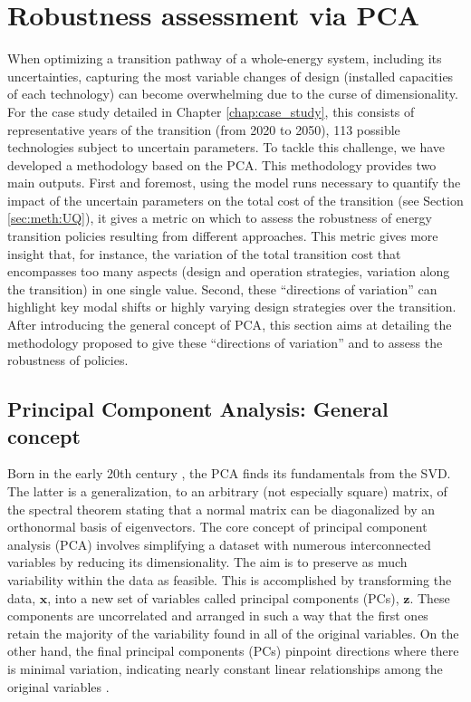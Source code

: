 \section{Robustness assessment via PCA}
\label{sec:meth:PCA}
When optimizing a transition pathway of a whole-energy system, including its uncertainties, capturing the most variable changes of design (\ie installed capacities of each technology) can become overwhelming due to the curse of dimensionality. For the case study detailed in Chapter \ref{chap:case_study}, this consists of  representative years of the transition (\ie from 2020 to 2050), 113 possible technologies subject to uncertain parameters. To tackle this challenge, we have developed a methodology based on the \acrfull{PCA}. This methodology provides two main outputs. First and foremost, using the model runs necessary to quantify the impact of the uncertain parameters on the total cost of the transition (see Section \ref{sec:meth:UQ}), it gives a metric on which to assess the robustness of energy transition policies resulting from different approaches. This metric gives more insight that, for instance, the variation of the total transition cost that encompasses too many aspects (\ie design and operation strategies, variation along the transition) in one single value. Second, these ``directions of variation'' can highlight key modal shifts or highly varying design strategies over the transition. After introducing the general concept of \gls{PCA}, this section aims at detailing the methodology proposed to give these ``directions of variation'' and to assess the robustness of policies.

\subsection{Principal Component Analysis: General concept}
\label{subsec:meth:PCA:PCA}
Born in the early 20th century \cite{pearson1901on,hotelling1933analysis}, the \acrfull{PCA} finds its fundamentals from the \gls{SVD}. The latter is a generalization, to an arbitrary (\ie not especially square) matrix, of the spectral theorem stating that a normal matrix can be diagonalized by an orthonormal basis of eigenvectors.  The core concept of principal component analysis (PCA) involves simplifying a dataset with numerous interconnected variables by reducing its dimensionality. The aim is to preserve as much variability within the data as feasible. This is accomplished by transforming the data, $\mathbf{x}$, into a new set of variables called principal components (PCs), $\mathbf{z}$. These components are uncorrelated and arranged in such a way that the first ones retain the majority of the variability found in all of the original variables. On the other hand, the final principal components (PCs) pinpoint directions where there is minimal variation, indicating nearly constant linear relationships among the original variables \cite{jolliffe2002principal}. 

